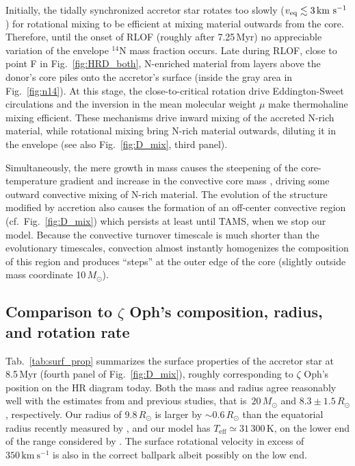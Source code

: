 \documentclass[twocolumn,twocolappendix,trackchanges]{aastex63}
\newcommand{\kms}{{\mathrm{km\ s^{-1}}}}
\DeclareRobustCommand{\Figref}[1]{Fig.~\ref{#1}}
\DeclareRobustCommand{\Tabref}[1]{Tab.~\ref{#1}}
\newcommand{\zoph}{$\zeta$ Oph}
\begin{document}
Initially, the tidally synchronized accretor star rotates too slowly
($v_{\rm eq} \lesssim 3\,\kms$) for rotational mixing to be efficient at mixing material outwards from
the core. Therefore, until the onset of RLOF (roughly after 7.25\,Myr) no
appreciable variation of the envelope $^{14}\mathrm{N}$ mass fraction
occurs. %
Late during RLOF, close to point F in %
\Figref{fig:HRD_both}, N-enriched material from layers above the donor's core piles
onto the accretor's surface (inside the gray area in \Figref{fig:n14}). At this stage, the
close-to-critical rotation drive Eddington-Sweet circulations and
the inversion in the mean molecular weight $\mu$ make thermohaline
mixing efficient. These mechanisms drive inward mixing of the accreted N-rich material, while rotational mixing bring N-rich material outwards, diluting it in the envelope (see also \Figref{fig:D_mix}, third panel).

Simultaneously, the mere growth in mass causes the steepening of the
core-temperature gradient and increase in the convective core mass
\citep[rejuvenation, e.g.,][]{schneider:16}, driving some outward
convective mixing of N-rich material. 
The evolution of the structure
modified by accretion also causes the formation of an off-center
convective region (cf.~\Figref{fig:D_mix}) which persists at least
until TAMS, when we stop our model. Because the convective turnover
timescale is much shorter than the evolutionary timescales, convection
almost instantly homogenizes the composition of this region and produces ``steps'' at
the outer edge of the core (slightly outside mass coordinate
10\,$M_\odot$).



\subsection{Comparison to \zoph's composition, radius, and rotation rate}
\label{sec:surf_comp}



\Tabref{tab:surf_prop} summarizes the surface properties of the
accretor star at 8.5\,Myr (fourth panel of \Figref{fig:D_mix}),
roughly corresponding to \zoph's position on the HR diagram
today. Both the mass and radius agree reasonably well with the
estimates from  and previous studies, that
is~$20\,M_\odot$ and $8.3\pm1.5\,R_\odot$, respectively. Our radius of
$9.8\,R_\odot$ is larger by $\sim0.6\,R_\odot$ than the equatorial
radius recently measured by \cite{gordon:18}, and our model has
$T_\mathrm{eff}\simeq31\,300$\,K, on the lower end of the range
considered by . The surface
rotational velocity in excess of $350\,\kms$ is also in the correct
ballpark albeit possibly on the low end.
\end{document}
